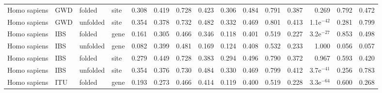 \begin{longtable}{llllrrrrrrrrrrr}
        Homo sapiens &                       GWD &    folded &  site &                              0.308 &                               0.419 &                 0.728 &                 0.423 &                              0.306 &                               0.484 &                 0.791 &                 0.387 &         0.269 &  0.792 &  0.472 \\
        Homo sapiens &                       GWD &  unfolded &  site &                              0.354 &                               0.378 &                 0.732 &                 0.482 &                              0.332 &                               0.469 &                 0.801 &                 0.413 &  1.1e$^{-42}$ &  0.281 &  0.799 \\
        Homo sapiens &                       IBS &    folded &  gene &                              0.161 &                               0.305 &                 0.466 &                 0.346 &                              0.118 &                               0.401 &                 0.519 &                 0.227 &  3.2e$^{-27}$ &  0.853 &  0.498 \\
        Homo sapiens &                       IBS &  unfolded &  gene &                              0.082 &                               0.399 &                 0.481 &                 0.169 &                              0.124 &                               0.408 &                 0.532 &                 0.233 &         1.000 &  0.056 &  0.057 \\
        Homo sapiens &                       IBS &    folded &  site &                              0.279 &                               0.449 &                 0.728 &                 0.383 &                              0.294 &                               0.496 &                 0.790 &                 0.372 &         0.967 &  0.593 &  0.420 \\
        Homo sapiens &                       IBS &  unfolded &  site &                              0.354 &                               0.376 &                 0.730 &                 0.484 &                              0.330 &                               0.469 &                 0.799 &                 0.412 &  3.7e$^{-41}$ &  0.256 &  0.783 \\
        Homo sapiens &                       ITU &    folded &  gene &                              0.193 &                               0.273 &                 0.466 &                 0.414 &                              0.119 &                               0.400 &                 0.519 &                 0.228 &  3.3e$^{-64}$ &  0.600 &  0.268 \\

\end{longtable}
